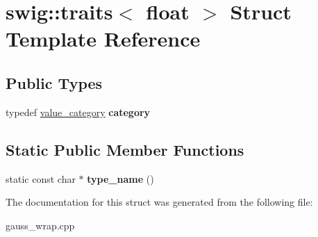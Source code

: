 \hypertarget{structswig_1_1traits_3_01float_01_4}{\section{swig\-:\-:traits$<$ float $>$ Struct Template Reference}
\label{structswig_1_1traits_3_01float_01_4}
}
\subsection*{Public Types}
\begin{DoxyCompactItemize}
\item 
\hypertarget{structswig_1_1traits_3_01float_01_4_aeafb977c1cee7c416912e5ca81a05c83}{typedef \hyperlink{structswig_1_1value__category}{value\-\_\-category} {\bfseries category}}\label{structswig_1_1traits_3_01float_01_4_aeafb977c1cee7c416912e5ca81a05c83}

\end{DoxyCompactItemize}
\subsection*{Static Public Member Functions}
\begin{DoxyCompactItemize}
\item 
\hypertarget{structswig_1_1traits_3_01float_01_4_a36ffd49da3ba140ec65b768d9e813564}{static const char $\ast$ {\bfseries type\-\_\-name} ()}\label{structswig_1_1traits_3_01float_01_4_a36ffd49da3ba140ec65b768d9e813564}

\end{DoxyCompactItemize}


The documentation for this struct was generated from the following file\-:\begin{DoxyCompactItemize}
\item 
gauss\-\_\-wrap.\-cpp\end{DoxyCompactItemize}
